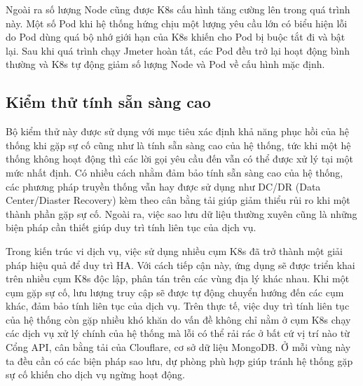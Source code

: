Ngoài ra số lượng Node cũng được K8s cấu hình tăng cường lên trong quá trình này.
Một số Pod khi hệ thống hứng chịu một lượng yêu cầu lớn có biểu hiện lỗi do Pod dùng quá bộ nhớ giới hạn của K8s khiến cho Pod bị buộc tắt đi và bật lại.
Sau khi quá trình chạy Jmeter hoàn tất, các Pod đều trở lại hoạt động bình thường và K8s tự động giảm số lượng Node và Pod về cấu hình mặc định.
\subsection{Kiểm thử tính sẵn sàng cao}
Bộ kiểm thử này được sử dụng với mục tiêu xác định khả năng phục hồi của hệ thống khi gặp sự cố cũng như là tính sẵn sàng cao của hệ thống, tức khi một hệ thống không hoạt động thì các lời gọi yêu cầu đến vẫn có thể được xử lý tại một mức nhất định.
Có nhiều cách nhằm đảm bảo tính sẵn sàng cao của hệ thống, các phương pháp truyền thống vẫn hay được sử dụng như DC/DR (Data Center/Diaster Recovery) kèm theo cân bằng tải giúp giảm thiểu rủi ro khi một thành phần gặp sự cố.
Ngoài ra, việc sao lưu dữ liệu thường xuyên cũng là những biện pháp cần thiết giúp duy trì tính liên tục của dịch vụ.

Trong kiến trúc vi dịch vụ, việc sử dụng nhiều cụm K8s đã trở thành một giải pháp hiệu quả để duy trì HA.
Với cách tiếp cận này, ứng dụng sẽ được triển khai trên nhiều cụm K8s độc lập, phân tán trên các vùng địa lý khác nhau.
Khi một cụm gặp sự cố, lưu lượng truy cập sẽ được tự động chuyển hướng đến các cụm khác, đảm bảo tính liên tục của dịch vụ.
Trên thực tế, việc duy trì tính liên tục của hệ thống còn gặp nhiều khó khăn do vấn đề không chỉ nằm ở cụm K8s chạy các dịch vụ xử lý chính của hệ thống mà lỗi có thể rải rác ở bất cứ vị trí nào từ Cổng API, cân bằng tải của Clouflare, cơ sở dữ liệu MongoDB.
Ở mỗi vùng này ta đều cần có các biện pháp sao lưu, dự phòng phù hợp giúp tránh hệ thống gặp sự cố khiến cho dịch vụ ngừng hoạt động.

